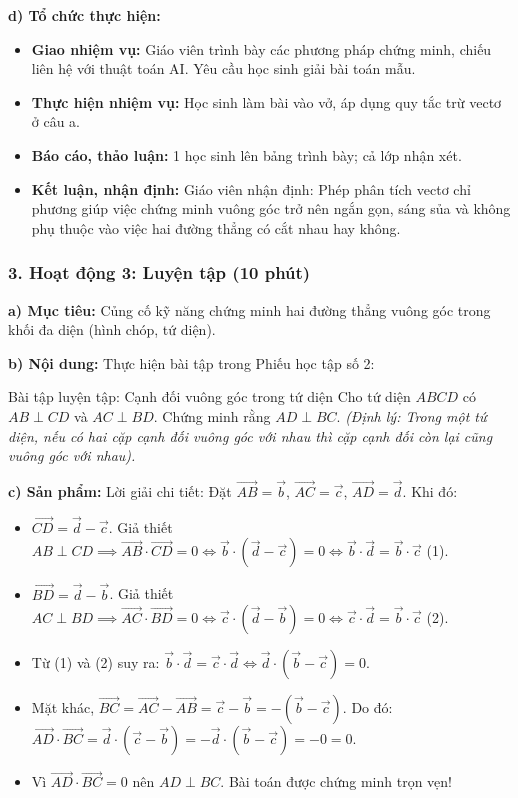 \documentclass[12pt, a4paper]{article}
\renewcommand{\vec}[1]{\overrightarrow{#1}}
\begin{document}
\noindent \textbf{d) Tổ chức thực hiện:}
\begin{itemize}[leftmargin=0.6cm]
    \item \textbf{Giao nhiệm vụ:} Giáo viên trình bày các phương pháp chứng minh, chiếu liên hệ với thuật toán AI. Yêu cầu học sinh giải bài toán mẫu.
    \item \textbf{Thực hiện nhiệm vụ:} Học sinh làm bài vào vở, áp dụng quy tắc trừ vectơ ở câu a.
    \item \textbf{Báo cáo, thảo luận:} 1 học sinh lên bảng trình bày; cả lớp nhận xét.
    \item \textbf{Kết luận, nhận định:} Giáo viên nhận định: Phép phân tích vectơ chỉ phương giúp việc chứng minh vuông góc trở nên ngắn gọn, sáng sủa và không phụ thuộc vào việc hai đường thẳng có cắt nhau hay không.
\end{itemize}

\subsubsection*{3. Hoạt động 3: Luyện tập (10 phút)}

\noindent \textbf{a) Mục tiêu:}
Củng cố kỹ năng chứng minh hai đường thẳng vuông góc trong khối đa diện (hình chóp, tứ diện).

\noindent \textbf{b) Nội dung:}
Thực hiện bài tập trong Phiếu học tập số 2:
\begin{pedabox}{Bài tập luyện tập: Cạnh đối vuông góc trong tứ diện}
Cho tứ diện $ABCD$ có $AB \perp CD$ và $AC \perp BD$. Chứng minh rằng $AD \perp BC$.
\textit{(Định lý: Trong một tứ diện, nếu có hai cặp cạnh đối vuông góc với nhau thì cặp cạnh đối còn lại cũng vuông góc với nhau).}
\end{pedabox}

\noindent \textbf{c) Sản phẩm:}
Lời giải chi tiết:
Đặt $\vec{AB} = \vec{b}$, $\vec{AC} = \vec{c}$, $\vec{AD} = \vec{d}$. Khi đó:
\begin{itemize}
    \item $\vec{CD} = \vec{d} - \vec{c}$. Giả thiết $AB \perp CD \implies \vec{AB} \cdot \vec{CD} = 0 \iff \vec{b} \cdot (\vec{d} - \vec{c}) = 0 \iff \vec{b} \cdot \vec{d} = \vec{b} \cdot \vec{c}$ \quad (1).
    \item $\vec{BD} = \vec{d} - \vec{b}$. Giả thiết $AC \perp BD \implies \vec{AC} \cdot \vec{BD} = 0 \iff \vec{c} \cdot (\vec{d} - \vec{b}) = 0 \iff \vec{c} \cdot \vec{d} = \vec{b} \cdot \vec{c}$ \quad (2).
    \item Từ (1) và (2) suy ra: $\vec{b} \cdot \vec{d} = \vec{c} \cdot \vec{d} \iff \vec{d} \cdot (\vec{b} - \vec{c}) = 0$.
    \item Mặt khác, $\vec{BC} = \vec{AC} - \vec{AB} = \vec{c} - \vec{b} = -(\vec{b} - \vec{c})$.
    Do đó: $\vec{AD} \cdot \vec{BC} = \vec{d} \cdot (\vec{c} - \vec{b}) = - \vec{d} \cdot (\vec{b} - \vec{c}) = -0 = 0$.
    \item Vì $\vec{AD} \cdot \vec{BC} = 0$ nên $AD \perp BC$. Bài toán được chứng minh trọn vẹn!
\end{itemize}
\end{document}
